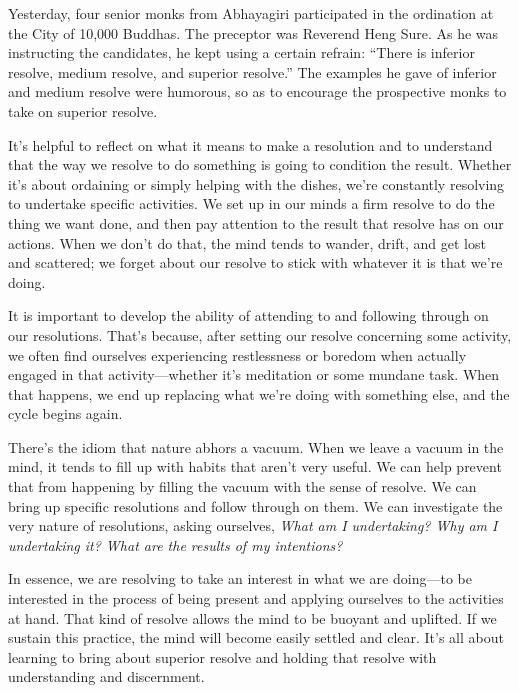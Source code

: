 
Yesterday, four senior monks from Abhayagiri participated in the 
ordination at the City of 10,000 Buddhas. The preceptor was Reverend 
Heng Sure. As he was instructing the candidates, he kept using a 
certain refrain: ``There is inferior resolve, medium resolve, and 
superior resolve.'' The examples he gave of inferior and medium resolve 
were humorous, so as to encourage the prospective monks to take on 
superior resolve.

It's helpful to reflect on what it means to make a resolution and to 
understand that the way we resolve to do something is going to 
condition the result. Whether it's about ordaining or simply helping 
with the dishes, we're constantly resolving to undertake specific 
activities. We set up in our minds a firm resolve to do the thing we 
want done, and then pay attention to the result that resolve has on our 
actions. When we don't do that, the mind tends to wander, drift, and 
get lost and scattered; we forget about our resolve to stick with 
whatever it is that we're doing.

It is important to develop the ability of attending to and following 
through on our resolutions. That's because, after setting our resolve 
concerning some activity, we often find ourselves experiencing 
restlessness or boredom when actually engaged in that 
activity---whether it's meditation or some mundane task. When that 
happens, we end up replacing what we're doing with something else, and 
the cycle begins again.

There's the idiom that nature abhors a vacuum. When we leave a vacuum 
in the mind, it tends to fill up with habits that aren't very useful. 
We can help prevent that from happening by filling the vacuum with the 
sense of resolve. We can bring up specific resolutions and follow 
through on them. We can investigate the very nature of resolutions, 
asking ourselves, \emph{What am I undertaking? Why am I undertaking it? 
What are the results of my intentions?}

In essence, we are resolving to take an interest in what we are 
doing---to be interested in the process of being present and applying 
ourselves to the activities at hand. That kind of resolve allows the 
mind to be buoyant and uplifted. If we sustain this practice, the mind 
will become easily settled and clear. It's all about learning to bring 
about superior resolve and holding that resolve with understanding and 
discernment.


